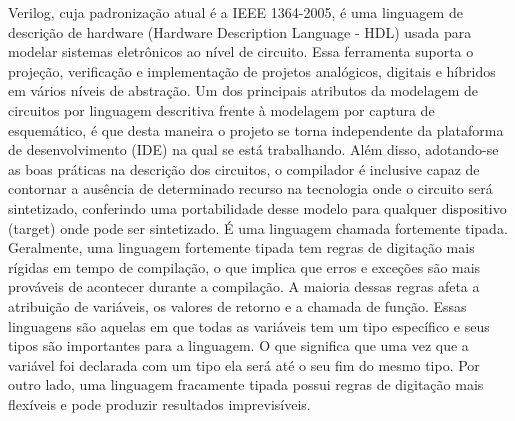 \documentclass[14pt, oneside]{book}
\newcommand\tab[1][1cm]{\hspace*{#1}}
\theoremstyle{definition}
\begin{document}
	        \tab Verilog, cuja padronização atual é a IEEE 1364-2005, é uma linguagem de descrição de hardware (Hardware Description Language - HDL) usada para modelar sistemas eletrônicos ao nível de circuito. Essa ferramenta suporta o projeção, verificação e implementação de projetos analógicos, digitais e híbridos em vários níveis de abstração. Um dos principais atributos da modelagem de circuitos por linguagem descritiva frente à modelagem por captura de esquemático, é que desta maneira o projeto se torna independente da plataforma de desenvolvimento (IDE) na qual se está trabalhando. Além disso, adotando-se as boas práticas na descrição dos circuitos, o compilador é inclusive capaz de contornar a ausência de determinado recurso na tecnologia onde o circuito será sintetizado, conferindo uma portabilidade desse modelo para qualquer dispositivo (target) onde pode ser sintetizado. É uma linguagem chamada fortemente tipada. \\
	        \tab Geralmente, uma linguagem fortemente tipada tem regras de digitação mais rígidas em tempo de compilação, o que implica que erros e exceções são mais prováveis de acontecer durante a compilação. A maioria dessas regras afeta a atribuição de variáveis, os valores de retorno e a chamada de função. Essas linguagens são aquelas em que todas as variáveis tem um tipo específico e seus tipos são importantes para a linguagem. O que significa que uma vez que a variável foi declarada com um tipo ela será até o seu fim do mesmo tipo. Por outro lado, uma linguagem fracamente tipada possui regras de digitação mais flexíveis e pode produzir resultados imprevisíveis. %
	        
           
            
\end{document}
